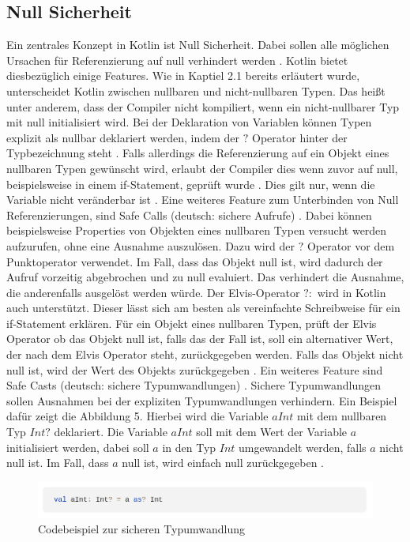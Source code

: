 \documentclass{article}
\begin{document}
\subsection{Null Sicherheit}
Ein zentrales Konzept in Kotlin ist Null Sicherheit. Dabei sollen alle möglichen Ursachen für Referenzierung auf null verhindert werden \cite{KotlinLangDoc}. Kotlin bietet diesbezüglich einige Features. Wie in Kaptiel 2.1 bereits erläutert wurde, unterscheidet Kotlin zwischen nullbaren und nicht-nullbaren Typen. Das heißt unter anderem, dass der Compiler nicht kompiliert, wenn ein nicht-nullbarer Typ mit null initialisiert wird. Bei der Deklaration von Variablen können Typen explizit als nullbar deklariert werden, indem der $?$ Operator hinter der Typbezeichnung steht \cite{KotlinLangDoc}. Falls allerdings die Referenzierung auf ein Objekt eines nullbaren Typen gewünscht wird, erlaubt der Compiler dies wenn zuvor auf null, beispielsweise in einem if-Statement, geprüft wurde \cite{KotlinLangDoc}. Dies gilt nur, wenn die Variable nicht veränderbar ist \cite{KotlinLangDoc}. \newline
Eine weiteres Feature zum Unterbinden von Null Referenzierungen, sind Safe Calls (deutsch: sichere Aufrufe) \cite{KotlinLangDoc}. Dabei können beispielsweise Properties von Objekten eines nullbaren Typen versucht werden aufzurufen, ohne eine Ausnahme auszulösen. Dazu wird der $?$ Operator vor dem Punktoperator verwendet. Im Fall, dass das Objekt null ist, wird dadurch der Aufruf vorzeitig abgebrochen und zu null evaluiert. Das verhindert die Ausnahme, die anderenfalls ausgelöst werden würde. \newline
Der Elvis-Operator $?:$ wird in Kotlin auch unterstützt. Dieser lässt sich am besten als vereinfachte Schreibweise für ein if-Statement erklären. Für ein Objekt eines nullbaren Typen, prüft der Elvis Operator ob das Objekt null ist, falls das der Fall ist, soll ein alternativer Wert, der nach dem Elvis Operator steht, zurückgegeben werden. Falls das Objekt nicht null ist, wird der Wert des Objekts zurückgegeben \cite{KotlinLangDoc}. \newline
Ein weiteres Feature sind Safe Casts (deutsch: sichere Typumwandlungen) \cite{KotlinLangDoc}. Sichere Typumwandlungen sollen Ausnahmen bei der expliziten Typumwandlungen verhindern. Ein Beispiel dafür zeigt die Abbildung 5. Hierbei wird die Variable $aInt$ mit dem nullbaren Typ $Int?$ deklariert. Die Variable $aInt$ soll mit dem Wert der Variable $a$ initialisiert werden, dabei soll $a$ in den Typ $Int$ umgewandelt werden, falls $a$ nicht null ist. Im Fall, dass $a$ null ist, wird einfach null zurückgegeben \cite{KotlinLangDoc}.
\begin{figure}[!htb]
    \centering
    \includegraphics[width=\linewidth]{img/SafeCast.png}
    \caption{Codebeispiel zur sicheren Typumwandlung\footnotemark}
\end{figure}
\end{document}
